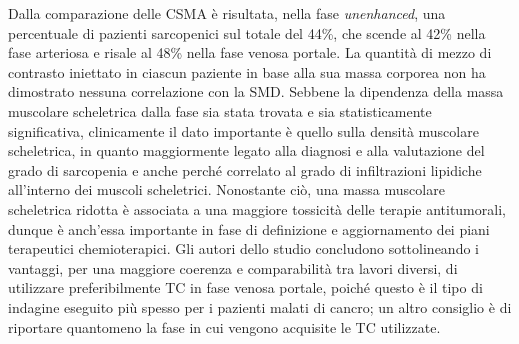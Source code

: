 \vspace{-5pt}Dalla comparazione delle CSMA è risultata, nella fase \textit{unenhanced}, una percentuale di pazienti sarcopenici sul totale del 44\%, che scende al 42\% nella fase arteriosa e risale al 48\% nella fase venosa portale. La quantità di mezzo di contrasto iniettato in ciascun paziente in base alla sua massa corporea non ha dimostrato nessuna correlazione con la SMD. Sebbene la dipendenza della massa muscolare scheletrica dalla fase sia stata trovata e sia statisticamente significativa, clinicamente il dato importante è quello sulla densità muscolare scheletrica, in quanto maggiormente legato alla diagnosi e alla valutazione del grado di sarcopenia e anche perché correlato al grado di infiltrazioni lipidiche all'interno dei muscoli scheletrici. Nonostante ciò, una massa muscolare scheletrica ridotta è associata a una maggiore tossicità delle terapie antitumorali, dunque è anch'essa importante in fase di definizione e aggiornamento dei piani terapeutici chemioterapici. Gli autori dello studio concludono sottolineando i vantaggi, per una maggiore coerenza e comparabilità tra lavori diversi, di utilizzare preferibilmente TC in fase venosa portale, poiché questo è il tipo di indagine eseguito più spesso per i pazienti malati di cancro; un altro consiglio è di riportare quantomeno la fase in cui vengono acquisite le TC utilizzate.

